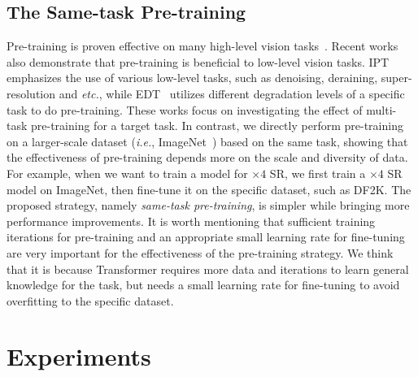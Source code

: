 \documentclass[10pt,twocolumn,letterpaper]{article}
\begin{document}
\subsection{The Same-task Pre-training}
Pre-training is proven effective on many high-level vision tasks~\cite{vit,bao2021beit,he2022masked}. Recent works~\cite{ipt,edt} also demonstrate that pre-training is beneficial to low-level vision tasks. IPT~\cite{ipt} emphasizes the use of various low-level tasks, such as denoising, deraining, super-resolution and \textit{etc.}, while EDT~\cite{edt} utilizes different degradation levels of a specific task to do pre-training. These works focus on investigating the effect of multi-task pre-training for a target task. In contrast, we directly perform pre-training on a larger-scale dataset (\textit{i.e.}, ImageNet~\cite{imagenet}) based on the same task, showing that the effectiveness of pre-training depends more on the scale and diversity of data. For example, when we want to train a model for $\times 4$ SR, we first train a $\times 4$ SR model on ImageNet, then fine-tune it on the specific dataset, such as DF2K. The proposed strategy, namely \textit{same-task pre-training}, is simpler while bringing more performance improvements. It is worth mentioning that sufficient training iterations for pre-training and an appropriate small learning rate for fine-tuning are very important for the effectiveness of the pre-training strategy. We think that it is because Transformer requires more data and iterations to learn general knowledge for the task, but 
needs a small learning rate for fine-tuning to avoid overfitting to the specific dataset.

\section{Experiments}
\end{document}
